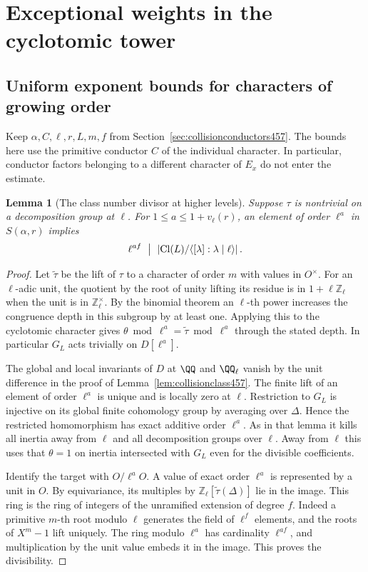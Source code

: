 \documentclass[a4paper,11pt]{article}
\newtheorem{lemma}[proposition]{Lemma}
\theoremstyle{definition}
\theoremstyle{remark}
\newcommand{\ZZ}{\mathbb Z}\newcommand{\ord}{\operatorname{ord}}
\numberwithin{equation}{section}
\newcommand{\Cl}{\operatorname{Cl}}
\begin{document}
\section{Exceptional weights in the cyclotomic tower}\label{nav:chapter-dyadic-exceptional-weights}

\subsection{Uniform exponent bounds for characters of growing order}
\label{sec:collisiondepth458}

Keep \(\alpha,C,\ell,r,L,m,f\) from
Section~\ref{sec:collisionconductors457}. The bounds here use the
primitive conductor \(C\) of the individual character. In
particular, conductor factors belonging to a different character
of \(E_x\) do not enter the estimate.

\begin{lemma}[The class number divisor at higher levels]\leavevmode
\label{lem:collisiondepth458}
Suppose \(\tau\) is nontrivial on a decomposition group at
\(\ell\). For \(1\le a\le 1+v_\ell(r)\), an element of order
\(\ell^a\) in \(S(\alpha,r)\) implies
\[
    \ell^{af}\ \bigm|\ 
       \left|\Cl(L)/\langle[\lambda]\mathrel{:}\lambda\mid\ell
                                      \rangle\right|.
\]
\end{lemma}
\begin{proof}
Let \(\widetilde\tau\) be the lift of \(\tau\) to a character of
order \(m\) with values in \(O^\times\). For an \(\ell\)-adic unit,
the quotient by the root of unity lifting its residue is in
\(1+\ell\ZZ_\ell\) when the unit is in \(\ZZ_\ell^\times\).
By the binomial theorem an \(\ell\)-th power increases the
congruence depth in this subgroup by at least one. Applying this
to the cyclotomic character gives
\(\theta\bmod\ell^a=\widetilde\tau\bmod\ell^a\) through the
stated depth. In particular \(G_L\) acts trivially on
\(D[\ell^a]\).

The global and local invariants of \(D\) at \(\QQ\) and
\(\QQ_\ell\) vanish by the unit difference in the proof of
Lemma~\ref{lem:collisionclass457}. The finite lift of an
element of order \(\ell^a\) is unique and is locally zero at
\(\ell\). Restriction to \(G_L\) is injective on its global
finite cohomology group by averaging over \(\Delta\). Hence the
restricted homomorphism has exact additive order \(\ell^a\).
As in that lemma it kills all inertia away from \(\ell\) and
all decomposition groups over \(\ell\). Away from \(\ell\) this
uses that \(\theta=1\) on inertia intersected with \(G_L\)
even for the divisible coefficients.

Identify the target with \(O/\ell^a O\). A value of exact order
\(\ell^a\) is represented by a unit in \(O\). By equivariance,
its multiples by \(\ZZ_\ell[\widetilde\tau(\Delta)]\) lie in
the image. This ring is the ring of integers of the unramified
extension of degree \(f\). Indeed a primitive \(m\)-th root
modulo \(\ell\) generates the field of \(\ell^f\) elements,
and the roots of \(X^m-1\) lift uniquely. The ring modulo
\(\ell^a\) has cardinality \(\ell^{af}\), and multiplication
by the unit value embeds it in the image. This proves the
divisibility.
\end{proof}
\end{document}
